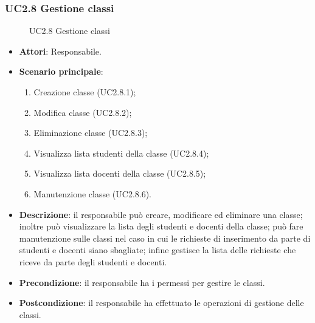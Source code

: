 \subsubsection{UC2.8 Gestione classi}
\begin{figure}[H]
\centering
\noindent{}
\caption{UC2.8 Gestione classi}
\end{figure}
\begin{itemize}
\item \textbf{Attori}: Responsabile.
\item \textbf{Scenario principale}:
\begin{enumerate}
\item Creazione classe (UC2.8.1);
\item Modifica classe (UC2.8.2);
\item Eliminazione classe (UC2.8.3);
\item Visualizza lista studenti della classe (UC2.8.4);
\item Visualizza lista docenti della classe (UC2.8.5);
\item Manutenzione classe (UC2.8.6).
\end{enumerate}
\item \textbf{Descrizione}: il responsabile può creare, modificare ed eliminare una classe; inoltre può visualizzare la lista degli studenti e docenti della classe; può fare manutenzione sulle classi nel caso in cui le richieste di inserimento da parte di studenti e docenti siano sbagliate; infine gestisce la lista delle richieste che riceve da parte degli studenti e docenti.
\item \textbf{Precondizione}: il responsabile ha i permessi per gestire le classi.
\item \textbf{Postcondizione}: il responsabile ha effettuato le operazioni di gestione delle classi.
\end{itemize}
